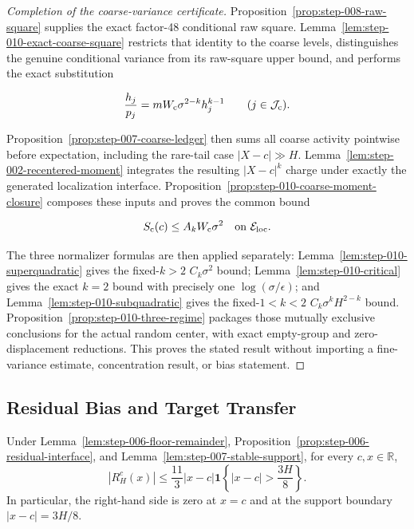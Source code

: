 \begin{proof}[Completion of the coarse-variance certificate]
Proposition~\ref{prop:step-008-raw-square} supplies the exact
factor-48 conditional raw square. Lemma~\ref{lem:step-010-exact-coarse-square}
restricts that identity to the coarse levels, distinguishes the genuine
conditional variance from its raw-square upper bound, and performs the exact
substitution

\[
\frac{h_j}{p_j}
=mW_{\rm c}\sigma^{2-k}h_j^{k-1}
\qquad(j\in\mathcal J_{\rm c}).
\]

Proposition~\ref{prop:step-007-coarse-ledger} then sums all
coarse activity pointwise before expectation, including the rare-tail case
\(|X-c|\gg H\). Lemma~\ref{lem:step-002-recentered-moment} integrates the resulting
\(|X-c|^k\) charge under exactly the generated localization interface.
Proposition~\ref{prop:step-010-coarse-moment-closure} composes these
inputs and proves the common bound

\[
S_{\rm c}(c)\leq A_kW_{\rm c}\sigma^2
\quad\text{on }\mathcal E_{\rm loc}.
\]

The three normalizer formulas are then applied separately:
Lemma~\ref{lem:step-010-superquadratic} gives the fixed-\(k>2\)
\(C_k\sigma^2\) bound; Lemma~\ref{lem:step-010-critical} gives the exact
\(k=2\) bound with precisely one \(\log(\sigma/\epsilon)\); and
Lemma~\ref{lem:step-010-subquadratic} gives the fixed-\(1<k<2\)
\(C_k\sigma^kH^{2-k}\) bound. Proposition~\ref{prop:step-010-three-regime}
packages those mutually exclusive conclusions for the actual random center,
with exact empty-group and zero-displacement reductions. This proves the stated result without importing a fine-variance estimate,
concentration result, or bias statement.
\end{proof}

\subsection{Residual Bias and Target Transfer}\label{app:step-011}

\begin{lemma}\label{lem:step-011-top-envelope}
Under Lemma~\ref{lem:step-006-floor-remainder},
Proposition~\ref{prop:step-006-residual-interface}, and
Lemma~\ref{lem:step-007-stable-support}, for every
\(c,x\in\mathbb R\),
\[
\left|R_H^c(x)\right|
\leq\frac{11}{3}|x-c|
\mathbf1\left\{|x-c|>\frac{3H}{8}\right\}.
\]
In particular, the right-hand side is zero at \(x=c\) and at the support
boundary \(|x-c|=3H/8\).
\end{lemma}

